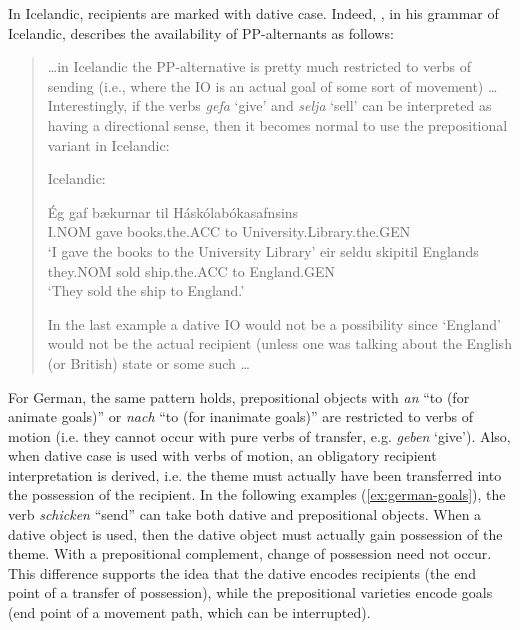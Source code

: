 	In Icelandic, recipients are marked with dative case. Indeed, \cite{Thrainsson.2007}, in his grammar of Icelandic, describes the availability of PP-alternants as follows: 
	\begin{quotation}
	\ldots in Icelandic the PP-alternative is pretty much restricted to verbs of sending (i.e., where the IO is an actual goal of some sort of movement) \ldots Interestingly, if the verbs \textit{gefa} `give' and \textit{selja} `sell' can be interpreted as having a directional sense, then it becomes normal to use the prepositional variant in Icelandic:
	\begin{exe}
		\ex Icelandic: \label{ex:icelandic-goals}
		\begin{xlist}
		\ex \gll \'{E}g gaf b\ae kurnar til H\'ask\'olab\'okasafnsins\\
		I.NOM gave books.the.ACC to University.Library.the.GEN\\
		\trans `I gave the books to the University Library'
		\ex \gll \th eir seldu skipi\dh til Englands\\
		they.NOM sold ship.the.ACC to England.GEN\\
		\trans `They sold the ship to England.'
		\end{xlist}
	\end{exe}
	In the last example a dative IO would not be a possibility since `England' would not be the actual recipient (unless one was talking about the English (or British) state or some such \ldots \citep[fn 64]{Thrainsson.2007}
	\end{quotation}
	For German, the same pattern holds, prepositional objects with \textit{an} ``to (for animate goals)'' or \textit{nach} ``to (for inanimate goals)'' are restricted to verbs of motion (i.e. they cannot occur with pure verbs of transfer, e.g. \textit{geben} `give'). Also, when dative case is used with verbs of motion, an obligatory recipient interpretation is derived, i.e. the theme must actually have been transferred into the possession of the recipient. In the following examples (\ref{ex:german-goals}), the verb \textit{schicken} ``send'' can take both dative and prepositional objects. When a dative object is used, then the dative object must actually gain possession of the theme. With a prepositional complement, change of possession need not occur. This difference supports the idea that the dative encodes recipients (the end point of a transfer of possession), while the prepositional varieties encode goals (end point of a movement path, which can be interrupted).

